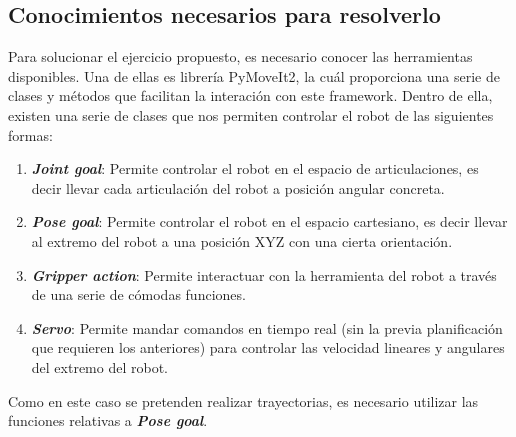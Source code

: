 \subsection*{Conocimientos necesarios para resolverlo}
\noindent Para solucionar el ejercicio propuesto, es necesario conocer las herramientas disponibles. Una de ellas es librería PyMoveIt2, 
la cuál proporciona una serie de clases y métodos que facilitan la interación con este framework. Dentro de ella, existen una serie de clases 
que nos permiten controlar el robot de las siguientes formas:
\begin{enumerate}
\item \textbf{\textit{Joint goal}}: Permite controlar el robot en el espacio de articulaciones, es decir llevar cada articulación del robot a posición angular concreta.
\item \textbf{\textit{Pose goal}}: Permite controlar el robot en el espacio cartesiano, es decir llevar al extremo del robot a una posición XYZ con una 
cierta orientación.
\item \textbf{\textit{Gripper action}}: Permite interactuar con la herramienta del robot a través de una serie de cómodas funciones.
\item \textbf{\textit{Servo}}: Permite mandar comandos en tiempo real (sin la previa planificación que requieren los anteriores) para controlar las velocidad lineares y 
angulares del extremo del robot.

\end{enumerate}

Como en este caso se pretenden realizar trayectorias, es necesario utilizar las funciones relativas a \textbf{\textit{Pose goal}}.


